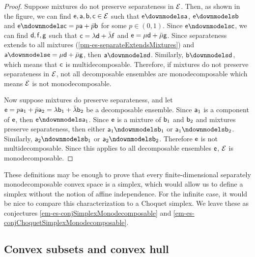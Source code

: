 \begin{mathSection}
\begin{proof}
	Suppose mixtures do not preserve separateness in $\Ens$. Then, as shown in the figure, we can find $\ens,\ens[a],\ens[b], \ens[c] \in \Ens$ such that $\ens \separate \ens[a]$, $\ens \separate \ens[b]$ and $\ens \nseparate \ens[c] = p \ens[a] + \bar{p} \ens[b]$ for some $p \in (0,1)$. Since $\ens \nseparate \ens[c]$, we can find $\ens[d], \ens[f], \ens[g]$ such that $\ens[c] = \lambda \ens[d] + \bar{\lambda} \ens[f]$ and $\ens = \mu \ens[d] + \bar{\mu} \ens[g]$.  Since separateness extends to all mixtures (\ref{pm-es-separateExtendsMixtures}) and $\ens[a] \separate \ens = \mu \ens[d] + \bar{\mu} \ens[g]$, then $\ens[a] \separate \ens[d]$. Similarly, $\ens[b] \separate \ens[d]$, which means that $\ens[c]$ is multidecomposable. Therefore, if mixtures do not preserve separateness in $\Ens$, not all decomposable ensembles are monodecomposable which means $\Ens$ is not monodecomposable.
	
	Now suppose mixtures do preserve separateness, and let $\ens = p \ens[a]_1 + \bar{p} \ens[a]_2 = \lambda \ens[b]_1 +\bar{\lambda} \ens[b]_2$ be a decomposable ensemble. Since $\ens[a]_1$ is a component of $\ens$, then $\ens \nseparate \ens[a]_1$. Since $\ens$ is a mixture of $\ens[b]_1$ and $\ens[b]_2$ and mixtures preserve separateness, then either $\ens[a]_1 \nseparate \ens[b]_1$ or $\ens[a]_1 \nseparate \ens[b]_2$. Similarly, $\ens[a]_2 \nseparate \ens[b]_1$ or $\ens[a]_2 \nseparate \ens[b]_2$. Therefore $\ens$ is not multidecomposable. Since this applies to all decomposable ensembles $\ens$, $\Ens$ is monodecomposable.
\end{proof}
\end{mathSection}

These definitions may be enough to prove that every finite-dimensional separately monodecomposable convex space is a simplex, which would allow us to define a simplex without the notion of affine independence. For the infinite case, it would be nice to compare this characterization to a Choquet simplex. We leave these as conjectures \ref{em-es-conjSimplexMonodecomposable} and \ref{em-es-conjChoquetSimplexMonodecomposable}.


\subsection{Convex subsets and convex hull}

